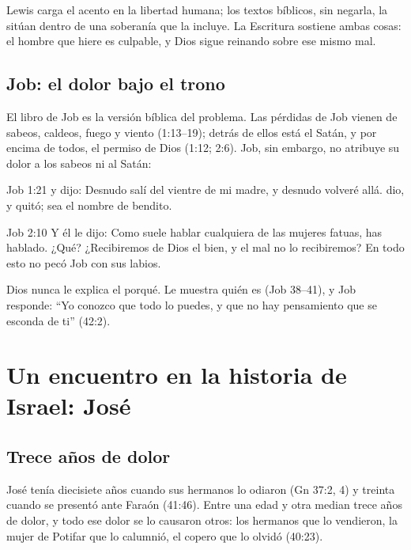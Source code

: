 Lewis carga el acento en la libertad humana; los textos bíblicos, sin negarla, la sitúan dentro de una soberanía que la incluye. La Escritura sostiene ambas cosas: el hombre que hiere es culpable, y Dios sigue reinando sobre ese mismo mal.


\subsection{Job: el dolor bajo el trono}
El libro de Job es la versión bíblica del problema. Las pérdidas de Job vienen de sabeos, caldeos, fuego y viento (1:13--19); detrás de ellos está el Satán, y por encima de todos, el permiso de Dios (1:12; 2:6). Job, sin embargo, no atribuye su dolor a los sabeos ni al Satán:

\begin{verso}{Job 1:21}
y dijo: Desnudo salí del vientre de mi madre, y desnudo volveré allá. \SENOR{} dio, y \SENOR{} quitó; sea el nombre de \SENOR{} bendito.
\end{verso}
\begin{verso}{Job 2:10}
Y él le dijo: Como suele hablar cualquiera de las mujeres fatuas, has hablado. ¿Qué? ¿Recibiremos de Dios el bien, y el mal no lo recibiremos? En todo esto no pecó Job con sus labios.
\end{verso}

Dios nunca le explica el porqué. Le muestra quién es (Job 38--41), y Job responde: ``Yo conozco que todo lo puedes, y que no hay pensamiento que se esconda de ti'' (42:2).

\section{Un encuentro en la historia de Israel: José}

\subsection{Trece años de dolor}
José tenía diecisiete años cuando sus hermanos lo odiaron (Gn 37:2, 4) y treinta cuando se presentó ante Faraón (41:46). Entre una edad y otra median trece años de dolor, y todo ese dolor se lo causaron otros: los hermanos que lo vendieron, la mujer de Potifar que lo calumnió, el copero que lo olvidó (40:23).

